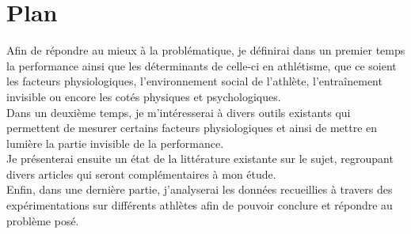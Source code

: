 \chapter*{Plan}
\label{chap:plan}


Afin de répondre au mieux à la problématique, je définirai dans un premier temps la performance ainsi que les déterminants de celle-ci en athlétisme, que ce soient les facteurs physiologiques, l'environnement social de l'athlète, l'entraînement invisible ou encore les cotés physiques et psychologiques.\\

Dans un deuxième temps, je m’intéresserai à divers outils existants qui permettent de mesurer certains facteurs physiologiques et ainsi de mettre en lumière la partie invisible de la performance. \\

Je présenterai ensuite un état de la littérature existante sur le sujet, regroupant divers articles qui seront complémentaires à mon étude.\\

Enfin, dans une dernière partie, j'analyserai les données recueillies à travers des expérimentations sur différents athlètes afin de pouvoir conclure et répondre au problème posé.



        
